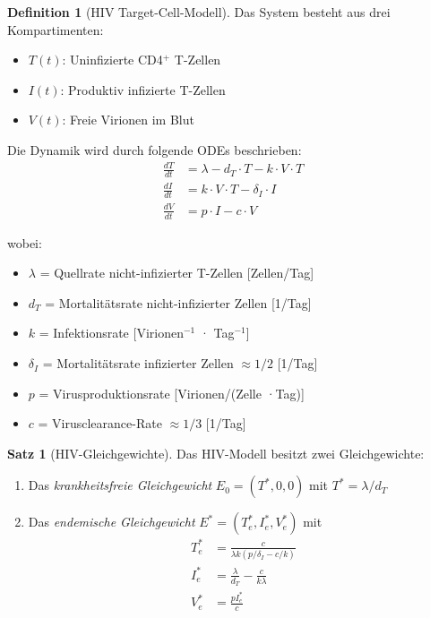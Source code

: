 ﻿\documentclass[a4paper,12pt]{article}
\theoremstyle{definition}
\newtheorem{definition}{Definition}
\newtheorem{satz}{Satz}
\begin{document}
\begin{definition}[HIV Target-Cell-Modell]
Das System besteht aus drei Kompartimenten:
\begin{itemize}
\item $T(t)$: Uninfizierte CD4$^+$ T-Zellen
\item $I(t)$: Produktiv infizierte T-Zellen
\item $V(t)$: Freie Virionen im Blut
\end{itemize}

Die Dynamik wird durch folgende ODEs beschrieben:
\begin{align}
\frac{dT}{dt} &= \lambda - d_T \cdot T - k \cdot V \cdot T \label{eq:hiv_t}\\
\frac{dI}{dt} &= k \cdot V \cdot T - \delta_I \cdot I \label{eq:hiv_i}\\
\frac{dV}{dt} &= p \cdot I - c \cdot V \label{eq:hiv_v}
\end{align}

wobei:
\begin{itemize}
\item $\lambda$ = Quellrate nicht-infizierter T-Zellen [Zellen/Tag]
\item $d_T$ = Mortalitätsrate nicht-infizierter Zellen [1/Tag]
\item $k$ = Infektionsrate [Virionen$^{-1}$  · Tag$^{-1}$]
\item $\delta_I$ = Mortalitätsrate infizierter Zellen $\approx 1/2$ [1/Tag]
\item $p$ = Virusproduktionsrate [Virionen/(Zelle ·Tag)]
\item $c$ = Virusclearance-Rate $\approx 1/3$ [1/Tag]
\end{itemize}
\end{definition}

\begin{satz}[HIV-Gleichgewichte]
Das HIV-Modell besitzt zwei Gleichgewichte:
\begin{enumerate}
\item Das \emph{krankheitsfreie Gleichgewicht} $E_0 = (T^*, 0, 0)$ mit $T^* = \lambda/d_T$
\item Das \emph{endemische Gleichgewicht} $E^* = (T_e^*, I_e^*, V_e^*)$ mit
\begin{align}
T_e^* &= \frac{c}{\lambda k (p/\delta_I - c/k)} \\
I_e^* &= \frac{\lambda}{d_T} - \frac{c}{k \lambda} \\
V_e^* &= \frac{p I_e^*}{c}
\end{align}
\end{enumerate}
\end{satz}
\end{document}
